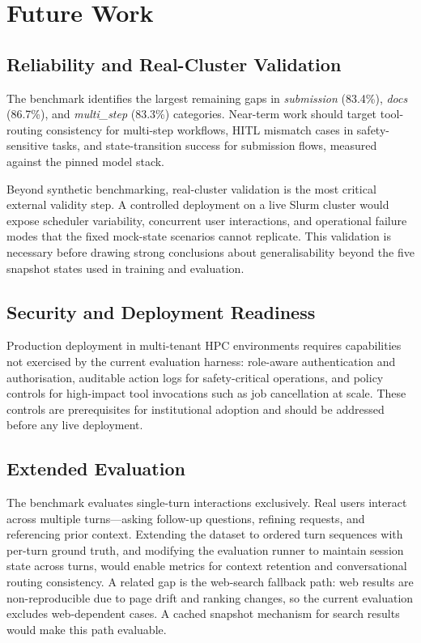 \section{Future Work}
\label{sec:future-work}

\subsection{Reliability and Real-Cluster Validation}

The benchmark identifies the largest remaining gaps in \textit{submission} (83.4\%), \textit{docs} (86.7\%), and \textit{multi\_step} (83.3\%) categories. Near-term work should target tool-routing consistency for multi-step workflows, HITL mismatch cases in safety-sensitive tasks, and state-transition success for submission flows, measured against the pinned model stack.

Beyond synthetic benchmarking, real-cluster validation is the most critical external validity step. A controlled deployment on a live Slurm cluster would expose scheduler variability, concurrent user interactions, and operational failure modes that the fixed mock-state scenarios cannot replicate. This validation is necessary before drawing strong conclusions about generalisability beyond the five snapshot states used in training and evaluation.

\subsection{Security and Deployment Readiness}

Production deployment in multi-tenant HPC environments requires capabilities not exercised by the current evaluation harness: role-aware authentication and authorisation, auditable action logs for safety-critical operations, and policy controls for high-impact tool invocations such as job cancellation at scale. These controls are prerequisites for institutional adoption and should be addressed before any live deployment.

\subsection{Extended Evaluation}

The benchmark evaluates single-turn interactions exclusively. Real users interact across multiple turns---asking follow-up questions, refining requests, and referencing prior context. Extending the dataset to ordered turn sequences with per-turn ground truth, and modifying the evaluation runner to maintain session state across turns, would enable metrics for context retention and conversational routing consistency. A related gap is the web-search fallback path: web results are non-reproducible due to page drift and ranking changes, so the current evaluation excludes web-dependent cases. A cached snapshot mechanism for search results would make this path evaluable.


